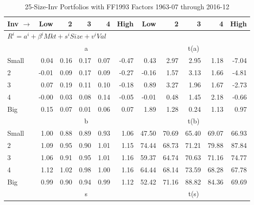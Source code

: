 
\begin{table}[!ht]
\centering
\caption{25-Size-Inv Portfolios with FF1993 Factors 1963-07 through 2016-12}
\begin{tabular}{lrrrrrrrrrr}
  \toprule
    Inv $\rightarrow$ & Low & 2 & 3 & 4 & High & Low & 2 & 3 & 4 & High \\ 
  \midrule
  \multicolumn{11}{l}{$R^i=a^i+\beta^iMkt+s^iSize+v^iVal$} \\

  
    
      & \multicolumn{5}{c}{a} & \multicolumn{5}{c}{t(a)}
    
    \\
      \cmidrule(r){2-6} \cmidrule(r){7-11}

    Small   & 0.04  & 0.16  & 0.17  & 0.07  & -0.47  & 0.43  & 2.97  & 2.95  & 1.18  & -7.04  \\
         2  & -0.01  & 0.09  & 0.17  & 0.09  & -0.27  & -0.16  & 1.57  & 3.13  & 1.66  & -4.81  \\
         3  & 0.07  & 0.19  & 0.11  & 0.10  & -0.18  & 0.89  & 3.27  & 1.96  & 1.67  & -2.73  \\
         4  & -0.00  & 0.03  & 0.08  & 0.14  & -0.05  & -0.01  & 0.48  & 1.45  & 2.18  & -0.66  \\
    Big     & 0.15  & 0.07  & 0.01  & 0.06  & 0.07  & 1.89  & 1.28  & 0.24  & 1.13  & 0.97  \\

  
    
      & \multicolumn{5}{c}{b} & \multicolumn{5}{c}{t(b)}
    
    \\
      \cmidrule(r){2-6} \cmidrule(r){7-11}

    Small   & 1.00  & 0.88  & 0.89  & 0.93  & 1.06  & 47.50  & 70.69  & 65.40  & 69.07  & 66.93  \\
         2  & 1.09  & 0.95  & 0.90  & 1.01  & 1.15  & 74.44  & 68.73  & 71.21  & 79.88  & 87.84  \\
         3  & 1.06  & 0.91  & 0.95  & 1.01  & 1.16  & 59.37  & 64.74  & 70.63  & 71.16  & 74.77  \\
         4  & 1.12  & 1.02  & 0.98  & 1.00  & 1.16  & 64.44  & 68.14  & 73.59  & 68.28  & 67.78  \\
    Big     & 0.99  & 0.90  & 0.94  & 0.99  & 1.12  & 52.42  & 71.16  & 88.82  & 84.36  & 69.69  \\

  
    
      & \multicolumn{5}{c}{s} & \multicolumn{5}{c}{t(s)}
    

\end{tabular}
\end{table}
